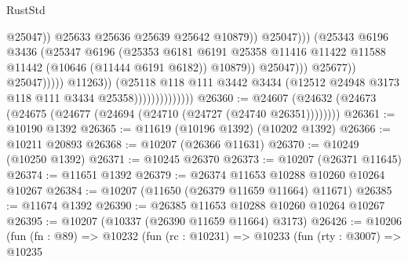 \begin{lexlean}{RustStd}
\begin{coremodule}
                                                                @25047))
                                                            @25633
                                                            @25636
                                                            @25639
                                                            @25642
                                                            @10879))
                                                        @25047)))
                                                  (@25343
                                                    @6196
                                                    @3436
                                                    (@25347
                                                      @6196
                                                      (@25353
                                                        @6181
                                                        @6191
                                                        @25358
                                                        @11416
                                                        @11422
                                                        @11588
                                                        @11442
                                                        (@10646 (@11444 @6191 @6182))
                                                        @10879))
                                                    @25047)))
                                              @25677))
                                          @25047)))))
                                @11263))
                            (@25118
                              @118
                              @111
                              @3442
                              @3434
                              (@12512 @24948 @3173 @118 @111 @3434 @25358))))))))))))))
@26360 := @24607 (@24632 (@24673 (@24675 (@24677 (@24694 (@24710 (@24727 (@24740 @26351))))))))
@26361 := @10190 @1392
@26365 := @11619 (@10196 @1392) (@10202 @1392)
@26366 := @10211 @20893
@26368 := @10207 (@26366 @11631)
@26370 := @10249 (@10250 @1392)
@26371 := @10245 @26370
@26373 := @10207 (@26371 @11645)
@26374 := @11651 @1392
@26379 := @26374 @11653 @10288 @10260 @10264 @10267
@26384 := @10207 (@11650 (@26379 @11659 @11664) @11671)
@26385 := @11674 @1392
@26390 := @26385 @11653 @10288 @10260 @10264 @10267
@26395 := @10207 (@10337 (@26390 @11659 @11664) @3173)
@26426 := @10206
    (fun (fn : @89) =>
    @10232
      (fun (rc : @10231) =>
      @10233
        (fun (rty : @3007) =>
        @10235

\end{coremodule}
\end{lexlean}
